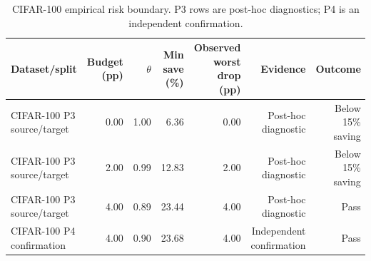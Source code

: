 \begin{table}[t]
\centering
\small
\caption{CIFAR-100 empirical risk boundary. P3 rows are post-hoc diagnostics; P4 is an independent confirmation.}
\label{tab:risk-boundary}
\begin{tabular}{lrrrrrr}
\toprule
Dataset/split & Budget (pp) & $\theta$ & Min save (\%) & Observed worst drop (pp) & Evidence & Outcome \\
\midrule
CIFAR-100 P3 source/target & 0.00 & 1.00 & 6.36 & 0.00 & Post-hoc diagnostic & Below 15\% saving \\
CIFAR-100 P3 source/target & 2.00 & 0.99 & 12.83 & 2.00 & Post-hoc diagnostic & Below 15\% saving \\
CIFAR-100 P3 source/target & 4.00 & 0.89 & 23.44 & 4.00 & Post-hoc diagnostic & Pass \\
CIFAR-100 P4 confirmation & 4.00 & 0.90 & 23.68 & 4.00 & Independent confirmation & Pass \\
\bottomrule
\end{tabular}
\end{table}
